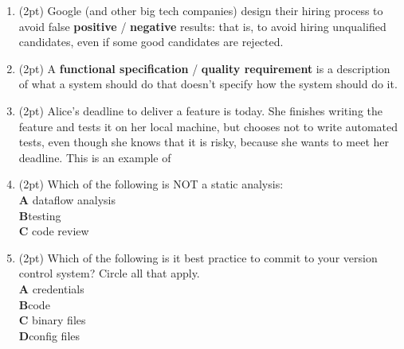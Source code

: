 \documentclass{report}
\newif\ifkey
\newcommand{\correct}[1]{\ifkey\color{red}\textbf{#1}\color{black}\else\textbf{#1}\fi\xspace}
\newcommand{\answershort}[1]{\ifkey\color{red}\underline{\textbf{#1}}\color{black}\else\underline{\hspace{3in}}\fi\xspace}
\newcommand{\vshortpts}{27}
\newcommand*{\pts}[1]{\addtocounter{points}{#1}(#1pt)}
\begin{document}
\begin{spacing}{1.4}
\begin{enumerate}[leftmargin=*]
  \newpage

  \textbf{II. Multiple Choice and Very Short Answer (\vshortpts pts).} In the following section, either circle your
  answer (possible answers appear in \textbf{bold}) or write a very short (one word or one phrase) answer in the space provided.

\item \pts{2} Google (and other big tech companies) design their hiring process
  to avoid false \correct{positive} / \textbf{negative} results: that is, to avoid hiring unqualified candidates,
  even if some good candidates are rejected.


\item \pts{2} A \correct{functional specification} / \textbf{quality requirement} is a description of what a system should do that doesn’t specify how the system should do it.

\item \pts{2} Alice's deadline to deliver a feature is today. She finishes writing the feature and tests it on her local machine, but chooses not to write automated tests,
  even though she knows that it is risky, because
  she wants to meet her deadline. This is an example of \answershort{technical debt}

\item \pts{2}
  Which of the following is NOT a static analysis:
  \\ \textbf{A}\hspace{0.2in} dataflow analysis
  \\ \correct{B}\hspace{0.2in}testing
  \\ \textbf{C}\hspace{0.2in} code review

\item \pts{2}
  Which of the following is it best practice to commit to your version control system? Circle all that apply.
  \\ \textbf{A}\hspace{0.2in} credentials
  \\ \correct{B}\hspace{0.2in}code
  \\ \textbf{C}\hspace{0.2in} binary files
  \\ \correct{D}\hspace{0.2in}config files


\end{enumerate}
\end{spacing}
\end{document}
